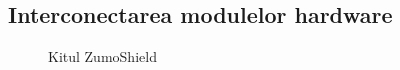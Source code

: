 \renewcommand{\appendixpagename}{Anexă}
\setcounter{figure}{0}  
\begin{appendices}
\section{Interconectarea modulelor hardware}
\label{sec:AnexaInterconectare}
\begin{figure}
    \vspace{-60pt}
    \vspace{-20pt}
    \caption{\label{fig:CodeWarrior-PExOutputIO} Kitul ZumoShield}
    \vspace{-10pt}
\end{figure}
\end{appendices}